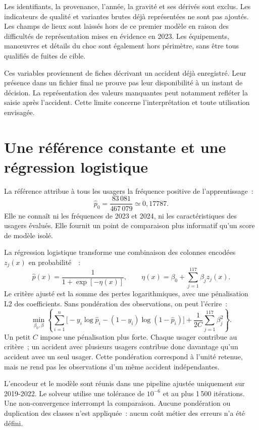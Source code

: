 Les identifiants, la provenance, l'année, la gravité et ses dérivés sont exclus.
Les indicateurs de qualité et variantes brutes déjà représentées ne sont pas ajoutés.
Les champs de lieux sont laissés hors de ce premier modèle en raison des difficultés
de représentation mises en évidence en 2023. Les équipements, manœuvres et détails du
choc sont également hors périmètre, sans être tous qualifiés de fuites de cible.

Ces variables proviennent de fiches décrivant un accident déjà enregistré. Leur
présence dans un fichier final ne prouve pas leur disponibilité à un instant de décision.
La représentation des valeurs manquantes peut notamment refléter la saisie après
l'accident. Cette limite concerne l'interprétation et toute utilisation envisagée.

\section{Une référence constante et une régression logistique}
La référence attribue à tous les usagers la fréquence positive de l'apprentissage~:
\[
  \widehat p_0=\frac{83\,081}{467\,079}\simeq 0{,}17787.
\]
Elle ne connaît ni les fréquences de 2023 et 2024, ni les caractéristiques des usagers
évalués. Elle fournit un point de comparaison plus informatif qu'un score de modèle isolé.

La régression logistique transforme une combinaison des colonnes encodées $z_j(x)$
en probabilité~\cite{sklearn-logistique}~:
\[
  \widehat p(x)=\frac{1}{1+\exp[-\eta(x)]},\qquad
  \eta(x)=\beta_0+\sum_{j=1}^{117}\beta_j z_j(x).
\]
Le critère ajusté est la somme des pertes logarithmiques, avec une pénalisation L2
des coefficients. Sans pondération des observations, on peut l'écrire~:
\[
  \min_{\beta_0,\beta}\left\{
  \sum_{i=1}^{n}\big[-y_i\log\widehat p_i-(1-y_i)\log(1-\widehat p_i)\big]
  +\frac{1}{2C}\sum_{j=1}^{117}\beta_j^2\right\}.
\]
Un petit $C$ impose une pénalisation plus forte. Chaque usager contribue au critère~;
un accident avec plusieurs usagers contribue donc davantage qu'un accident avec un seul
usager. Cette pondération correspond à l'unité retenue, mais ne rend pas les observations
d'un même accident indépendantes.

L'encodeur et le modèle sont réunis dans une pipeline ajustée uniquement sur 2019-2022.
Le solveur  utilise une tolérance de $10^{-6}$ et au plus 1\,500 itérations.
Une non-convergence interrompt la comparaison. Aucune pondération ou duplication des
classes n'est appliquée~: aucun coût métier des erreurs n'a été défini.

